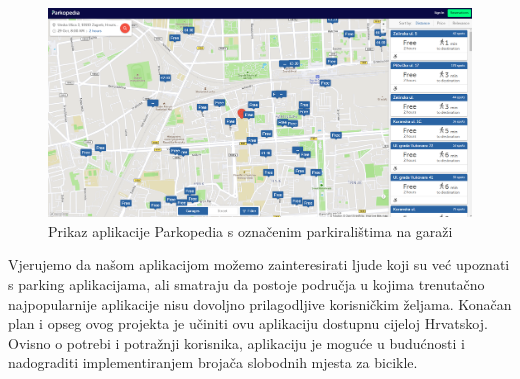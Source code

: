 		\begin{figure}[H]
			\includegraphics[width=\textwidth]{slike/parkopedia_garage.PNG}
			\caption{Prikaz aplikacije Parkopedia s označenim parkiralištima na garaži}
			\label{fig:promjene5} 
		\end{figure}
		
		Vjerujemo da našom aplikacijom možemo zainteresirati ljude koji su već upoznati s parking aplikacijama, ali smatraju da postoje područja u kojima trenutačno najpopularnije aplikacije nisu dovoljno prilagodljive korisničkim željama. Konačan plan i opseg ovog projekta je učiniti ovu aplikaciju dostupnu cijeloj Hrvatskoj. Ovisno o potrebi i potražnji korisnika, aplikaciju je moguće u budućnosti i nadograditi implementiranjem brojača slobodnih mjesta za bicikle.

		

		
	